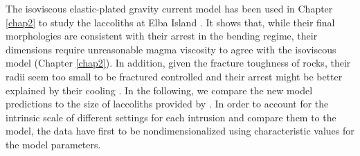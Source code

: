 The isoviscous elastic-plated  gravity current model has  been used in
Chapter   \ref{chap2}  to   study  the   laccoliths  at   Elba  Island
\citep{Michaut:2011kg}. It shows that,  while their final morphologies
are  consistent  with  their  arrest  in  the  bending  regime,  their
dimensions  require unreasonable  magma  viscosity to  agree with  the
isoviscous  model  (Chapter  \ref{chap2}).   In  addition,  given  the
fracture  toughness  of  rocks,  their  radii seem  too  small  to  be
fractured controlled  and their  arrest might  be better  explained by
their cooling  \citep{Michaut:2011kg}.  In  the following,  we compare
the  new model  predictions  to  the size  of  laccoliths provided  by
\citet{Rocchi:2002jy}.  In order to account for the intrinsic scale of
different settings for  each intrusion and compare them  to the model,
the  data have  first  to be  nondimensionalized using  characteristic
values for the model parameters.

